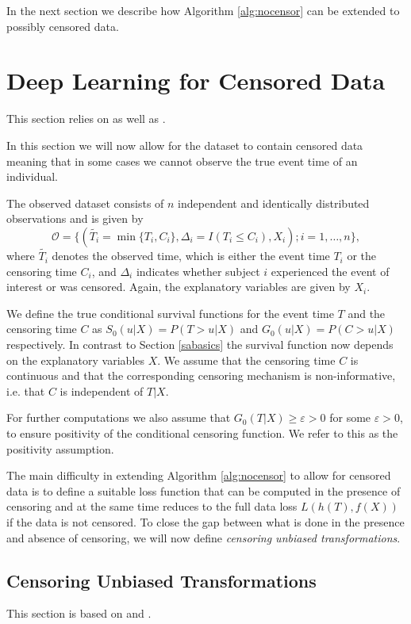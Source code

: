 \documentclass[12pt, a4paper]{scrartcl}
\theoremstyle{definition}
\theoremstyle{plain}
\numberwithin{equation}{section}
\numberwithin{figure}{section}
\numberwithin{table}{section}
\begin{document}
 	In the next section we describe how Algorithm \ref{alg:nocensor} can be extended to possibly censored data.
 	
	\newpage
	\section{Deep Learning for Censored Data} \label{censored}
	
	This section relies on \citet*{basearticle} as well as \citet*{deeplbook}.
	
	In this section we will now allow for the dataset to contain censored data meaning that in some cases we cannot observe the true event time of an individual.
	
	The observed dataset consists of $n$ independent and identically distributed observations and is given by
	$$\mathcal{O} = \{(\tilde{T_i} = \min \{T_i, C_i\}, \Delta_i = I(T_i \leq C_i), X_i); i = 1,\dots,n\},$$
	 where $\tilde{T_i}$ denotes the observed time, which is either the event time $T_i$ or the censoring time $C_i$, and $\Delta_i$ indicates whether subject $i$ experienced the event of interest or was censored.
	 Again, the explanatory variables are given by $X_i$.
	 
	 We define the true conditional survival functions for the event time $T$ and the censoring time $C$ as $S_0(u \vert X)=P(T>u \vert X)$ and $G_0(u \vert X)=P(C>u \vert X)$ respectively.
	 In contrast to Section \ref{sabasics} the survival function now depends on the explanatory variables $X$.
	 We assume that the censoring time $C$ is continuous and that the corresponding censoring mechanism is non-informative, i.e. that $C$ is independent of $T\vert X$.
	 
	 For further computations we also assume that $G_0(T \vert X)\geq \varepsilon > 0$ for some $\varepsilon >0$, to ensure positivity of the conditional censoring function.
	 We refer to this as the positivity assumption.
	
	The main difficulty in extending Algorithm \ref{alg:nocensor} to allow for censored data is to define a suitable loss function that can be computed in the presence of censoring and at the same time reduces to the full data loss $L(h(T), f(X))$ if the data is not censored.
	To close the gap between what is done in the presence and absence of censoring, we will now define \textit{censoring unbiased transformations}.
	
	\subsection{Censoring Unbiased Transformations}\label{sec:drtrafo}
	This section is based on \citet*{culs} and \citet*{drcut}.
	
\end{document}
